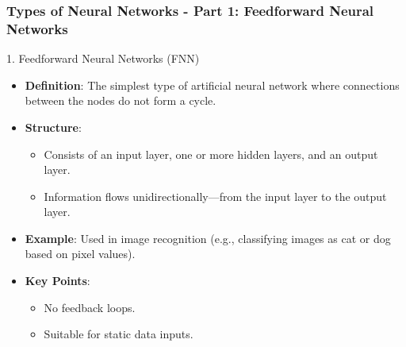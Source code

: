 \documentclass[aspectratio=169]{beamer}
\begin{document}
\begin{frame}[fragile]
    \frametitle{Types of Neural Networks - Part 1: Feedforward Neural Networks}
    \begin{block}{1. Feedforward Neural Networks (FNN)}
        \begin{itemize}
            \item \textbf{Definition}: The simplest type of artificial neural network where connections between the nodes do not form a cycle.
            \item \textbf{Structure}: 
            \begin{itemize}
                \item Consists of an input layer, one or more hidden layers, and an output layer. 
                \item Information flows unidirectionally—from the input layer to the output layer.
            \end{itemize}
            \item \textbf{Example}: 
              Used in image recognition (e.g., classifying images as cat or dog based on pixel values).
            \item \textbf{Key Points}:
              \begin{itemize}
                  \item No feedback loops.
                  \item Suitable for static data inputs.
              \end{itemize}
        \end{itemize}
    \end{block}
\end{frame}
\end{document}
